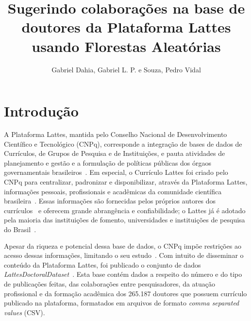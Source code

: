 \documentclass[12pt]{article}
\title{Sugerindo colaborações na base de doutores da Plataforma Lattes usando Florestas Aleatórias}
\author{Gabriel Dahia, Gabriel L. P. e Souza, Pedro Vidal}
\begin{document}
 

\maketitle

     


\section{Introdução}

A Plataforma Lattes, mantida pelo Conselho Nacional de Desenvolvimento Científico e Tecnológico (CNPq), corresponde a integração de bases de dados de Currículos, de Grupos de Pesquisa e de Instituições, e pauta atividades de planejamento e gestão e a formulação de políticas públicas dos órgaos governamentais brasileiros~\cite{lattes-cnpq}.
Em especial, o Currículo Lattes foi criado pelo CNPq para centralizar, padronizar e disponibilizar, através da Plataforma Lattes, informações pessoais, profissionais e acadêmicas da comunidade científica brasileira~\cite{sucupira}.
Essas informações são fornecidas pelos próprios autores dos currículos~\cite{sucupira} e oferecem grande abrangência e confiabilidade; o Lattes já é adotado pela maioria das instituições de fomento, universidades e instituições de pesquisa do Brasil~\cite{lattes-cnpq}.

Apesar da riqueza e potencial dessa base de dados, o CNPq impõe restrições ao acesso dessas informações, limitando o seu estudo~\cite{lattes-dataset}.
Com intuito de disseminar o conteúdo da Plataforma Lattes, foi publicado o conjunto de dados \emph{LattesDoctoralDataset}~\cite{lattes-dataset}.
Esta base contém dados a respeito do número e do tipo de publicações feitas, das colaborações entre pesquisadores, da atuação profissional e da formação acadêmica dos 265.187 doutores que possuem currículo publicado na plataforma, formatados em arquivos de formato \textit{comma separated values} (CSV).
\end{document}
